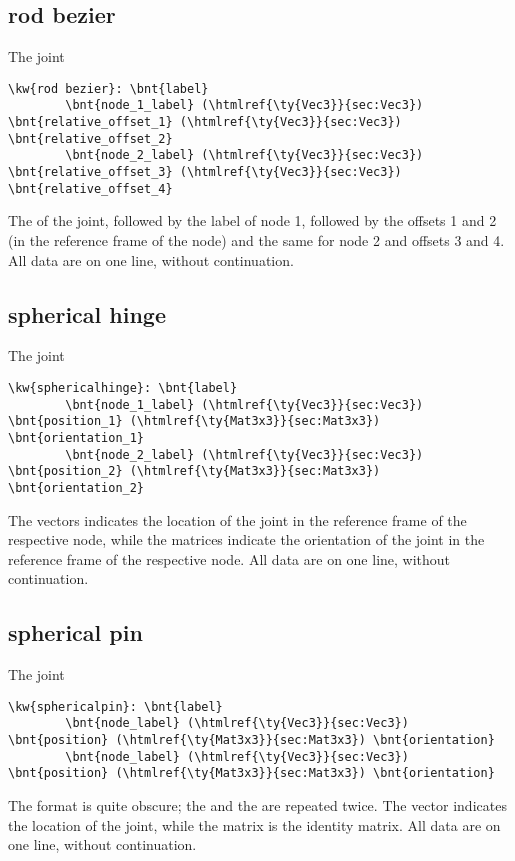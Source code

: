 \subsection{rod bezier}
The  joint
\begin{Verbatim}[commandchars=\\\{\}]
	\kw{rod bezier}: \bnt{label}
		\bnt{node_1_label} (\htmlref{\ty{Vec3}}{sec:Vec3}) \bnt{relative_offset_1} (\htmlref{\ty{Vec3}}{sec:Vec3}) \bnt{relative_offset_2}
		\bnt{node_2_label} (\htmlref{\ty{Vec3}}{sec:Vec3}) \bnt{relative_offset_3} (\htmlref{\ty{Vec3}}{sec:Vec3}) \bnt{relative_offset_4}
\end{Verbatim}
The  of the joint, followed by the label of node 1, 
followed by the offsets 1 and 2 (in the reference frame of the
node) and the same for node 2 and offsets 3 and 4.
All data are on one line, without continuation.

\subsection{spherical hinge}
The  joint
\begin{Verbatim}[commandchars=\\\{\}]
    \kw{sphericalhinge}: \bnt{label}
        \bnt{node_1_label} (\htmlref{\ty{Vec3}}{sec:Vec3}) \bnt{position_1} (\htmlref{\ty{Mat3x3}}{sec:Mat3x3}) \bnt{orientation_1}
        \bnt{node_2_label} (\htmlref{\ty{Vec3}}{sec:Vec3}) \bnt{position_2} (\htmlref{\ty{Mat3x3}}{sec:Mat3x3}) \bnt{orientation_2}
\end{Verbatim}
The  vectors indicates the location of the joint
in the reference frame of the respective node,
while the  matrices indicate the orientation of the joint
in the reference frame of the respective node.
All data are on one line, without continuation.

\subsection{spherical pin}
The  joint
\begin{Verbatim}[commandchars=\\\{\}]
    \kw{sphericalpin}: \bnt{label}
        \bnt{node_label} (\htmlref{\ty{Vec3}}{sec:Vec3}) \bnt{position} (\htmlref{\ty{Mat3x3}}{sec:Mat3x3}) \bnt{orientation}
        \bnt{node_label} (\htmlref{\ty{Vec3}}{sec:Vec3}) \bnt{position} (\htmlref{\ty{Mat3x3}}{sec:Mat3x3}) \bnt{orientation}
\end{Verbatim}
The format is quite obscure; the  and the 
are repeated twice.
The vector  indicates the location of the joint,
while the matrix  is the identity matrix.
All data are on one line, without continuation.

